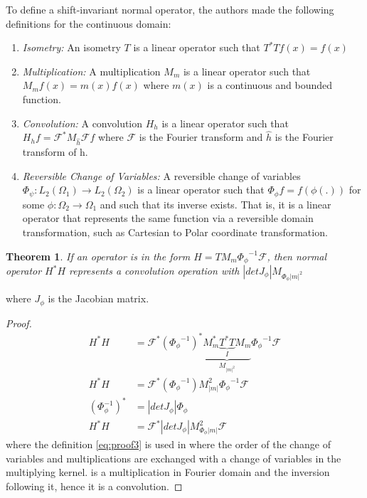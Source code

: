 \documentclass[journal, onecolumn, 11pt]{IEEEtran}
\newtheorem{theorem}{Theorem}
\begin{document}
To define a shift-invariant normal operator, the authors made the following definitions for the continuous domain: 
\begin{enumerate}
    \item \textit{Isometry:} An isometry $T$ is a linear operator such that $T^\ast T {f}(x) = f(x)$
    \item \textit{Multiplication:} A multiplication $M_m$ is a linear operator such that $M_m{f}(x) = m(x)f(x)$ where $m(x)$ is a continuous and bounded function.  
    \item \textit{Convolution:} A convolution $H_h$ is a linear operator such that $H_hf = \mathcal{F}^\ast M_{\hat{h}} \mathcal{F} f$ where $\mathcal{F}$ is the Fourier transform and $\hat{h}$ is the Fourier transform of h. 
    \item \textit{Reversible Change of Variables:} A reversible change of variables $\Phi_\psi: L_2(\Omega_1) \rightarrow L_2(\Omega_2)$ is a linear operator such that $\Phi_\phi f = f(\phi(.))$ for some $\phi: \Omega_2 \rightarrow \Omega_1$ and such that its inverse exists. That is, it is a linear operator that represents the same function via a reversible domain transformation, such as Cartesian to Polar coordinate transformation. 
\end{enumerate}

\begin{theorem}
    If an operator is in the form $H = TM_m{\Phi_\phi}^{-1}\mathcal{F}$, then normal operator $H^\ast H$ represents a convolution operation with $|det J_\phi| M_{\Phi_\phi |m|^2}$
    \label{thrm:Theorem1}
\end{theorem}
where $J_\phi$ is the Jacobian matrix.

\begin{proof}
    \begin{align}
        H^\ast H &= \mathcal{F}^\ast ({\Phi_\phi}^{-1})^\ast \underbrace{M_m^\ast \underbrace{T^\ast T}_{I} M_m}_{M_{{|m|}^2}} {\Phi_\phi}^{-1} \mathcal{F} \label{eq:proof1}\\ 
        H^\ast H &= \mathcal{F}^\ast ({\Phi_\phi}^{-1}) M_{|m|}^2 {\Phi_\phi}^{-1} \mathcal{F} \label{eq:proof2}\\
        (\Phi_\phi^{-1})^\ast &= |det J_\phi|\Phi_\phi \label{eq:proof3}\\
        H^\ast H &= \mathcal{F}^\ast |det J_\phi| M_{\Phi_\phi|m|}^2  \mathcal{F} \label{eq:proof4}
    \end{align}
    where the definition \ref{eq:proof3} is used in  where the order of the change of variables and multiplications are exchanged with a change of variables in the multiplying kernel.  is a multiplication in Fourier domain and the inversion following it, hence it is a convolution.
\end{proof}
\end{document}

